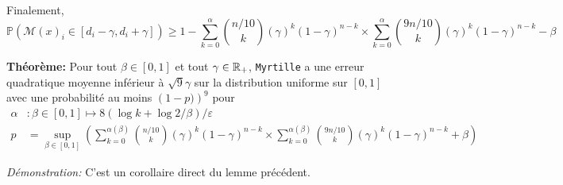 Finalement,
\[
    \mathbb P\left(  \mathcal M(x)_i \in [d_i - \gamma, d_i + \gamma] \right) \geq 1 - \sum_{k = 0}^{\alpha} \binom{n/10}{k}\left( \gamma \right)^k (1 - \gamma)^{n-k} \times \sum_{k = 0}^{\alpha} \binom{9n/10}{k}\left( \gamma \right)^k (1 - \gamma)^{n-k} - \beta  
\]


\vspace*{5pt}
\textbf{Théorème: } Pour tout \(\beta \in [0,1]\) et tout \(\gamma \in \mathbb{R}_+\), \texttt{Myrtille} a une erreur quadratique moyenne inférieur à \(\sqrt{9}\gamma\) sur la distribution uniforme sur \([0,1]\) avec une probabilité au moins \(\left( 1 - p) \right)^9\) pour 
\begin{align*}
    \alpha & : \beta \in [0,1] \mapsto  8\left( \log k + \log 2/\beta \right)/\varepsilon\\
    p & = \sup_{\beta \in [0,1]}\left( \sum_{k = 0}^{\alpha(\beta)} \binom{n/10}{k}\left( \gamma \right)^k (1 - \gamma)^{n-k} \times \sum_{k = 0}^{\alpha(\beta)} \binom{9n/10}{k}\left( \gamma \right)^k (1 - \gamma)^{n-k} + \beta \right)
\end{align*}

\textit{Démonstration:} C'est un corollaire direct du lemme précédent. 


